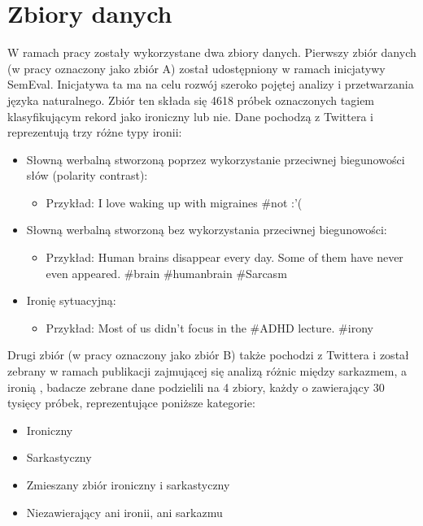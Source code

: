 \newpage %
\section{Zbiory danych} \label{dane_wejsciowe}



W ramach pracy zostały wykorzystane dwa zbiory danych. Pierwszy zbiór danych (w pracy oznaczony jako zbiór A) został udostępniony w ramach inicjatywy SemEval. Inicjatywa ta ma na celu rozwój szeroko pojętej analizy i przetwarzania języka naturalnego. Zbiór ten składa się 4618 próbek oznaczonych tagiem klasyfikującym rekord jako ironiczny lub nie. Dane pochodzą z Twittera i reprezentują trzy różne typy ironii:
\begin{itemize}
    \item Słowną werbalną stworzoną poprzez wykorzystanie przeciwnej biegunowości słów (polarity contrast):
          \begin{itemize}
              \item Przykład: I love waking up with migraines \#not :'(
          \end{itemize}

    \item Słowną werbalną stworzoną bez wykorzystania przeciwnej biegunowości:
          \begin{itemize}
              \item Przykład: Human brains disappear every day. Some of them have never even appeared. \#brain \#humanbrain \#Sarcasm
          \end{itemize}

    \item Ironię sytuacyjną:
          \begin{itemize}
              \item Przykład: Most of us didn't focus in the \#ADHD lecture. \#irony
          \end{itemize}
\end{itemize}



Drugi zbiór (w pracy oznaczony jako zbiór B) także pochodzi z Twittera i został zebrany w ramach publikacji zajmującej się analizą różnic między sarkazmem, a ironią  \cite{Ling2016}  , badacze zebrane dane podzielili na 4 zbiory, każdy o zawierający 30 tysięcy próbek,  reprezentujące poniższe kategorie:
\begin{itemize}
    \item Ironiczny
    \item Sarkastyczny
    \item Zmieszany zbiór ironiczny i sarkastyczny
    \item Niezawierający ani ironii, ani sarkazmu

\end{itemize}

